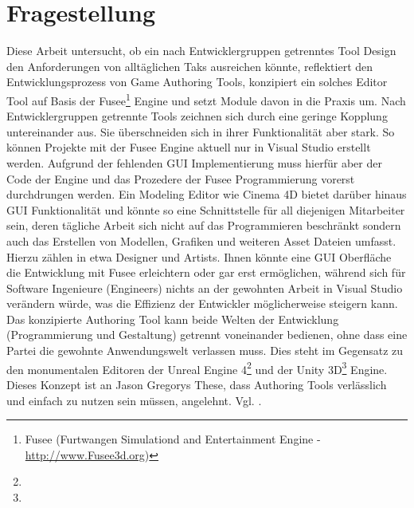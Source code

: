 \documentclass[pagesize, paper=a4, fontsize=12pt, titlepage=true, headings=small, headnosepline, abstractoff, liststotoc, nochapterprefix, plainheadsepline, twoside]{scrreprt}
\begin{document}
\section{Fragestellung}
Diese Arbeit untersucht, ob ein nach Entwicklergruppen getrenntes Tool Design den Anforderungen von alltäglichen Taks ausreichen könnte, reflektiert den Entwicklungsprozess von Game Authoring Tools, konzipiert ein solches Editor Tool auf Basis der Fusee\footnote{Fusee (Furtwangen Simulationd and Entertainment Engine - \url{http://www.Fusee3d.org})} Engine und setzt Module davon in die Praxis um. Nach Entwicklergruppen getrennte Tools zeichnen sich durch eine geringe Kopplung untereinander aus. Sie überschneiden sich in ihrer Funktionalität aber stark. So können Projekte mit der Fusee Engine aktuell nur in Visual Studio erstellt werden. Aufgrund der fehlenden GUI Implementierung muss hierfür aber der Code der Engine und das Prozedere der Fusee Programmierung vorerst durchdrungen werden. Ein Modeling Editor wie Cinema 4D bietet darüber hinaus GUI Funktionalität und könnte so eine Schnittstelle für all diejenigen Mitarbeiter sein, deren tägliche Arbeit sich nicht auf das Programmieren beschränkt sondern auch das Erstellen von Modellen, Grafiken und weiteren Asset Dateien umfasst. Hierzu zählen in etwa Designer und Artists. Ihnen könnte eine GUI Oberfläche die Entwicklung mit Fusee erleichtern oder gar erst ermöglichen, während sich für Software Ingenieure (Engineers) nichts an der gewohnten Arbeit in Visual Studio verändern würde, was die Effizienz der Entwickler möglicherweise steigern kann. Das konzipierte Authoring Tool kann beide Welten der Entwicklung (Programmierung und Gestaltung) getrennt voneinander bedienen, ohne dass eine Partei die gewohnte Anwendungswelt verlassen muss. Dies steht im Gegensatz zu den monumentalen Editoren der Unreal Engine 4\footnote{} und der Unity 3D\footnote{} Engine. 
Dieses Konzept ist an Jason Gregorys These, dass Authoring Tools verlässlich und einfach zu nutzen sein müssen, angelehnt. Vgl. .
\end{document}
